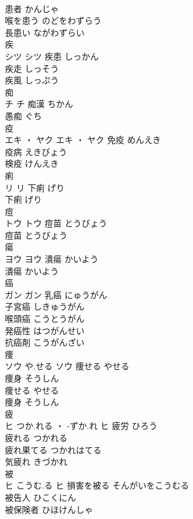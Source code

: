 \documentclass[8pt]{extreport}
\begin{document}
\begin{CJK}{UTF8}{min}
\\	患者	かんじゃ	
\\	喉を患う	のどをわずらう	
\\	長患い	ながわずらい	
\\	疾	
\\	シツ		シツ	疾患	しっかん	
\\	疾走	しっそう	
\\	疾風	しっぷう	
\\	痴	
\\	チ		チ	痴漢	ちかん	
\\	愚痴	ぐち	
\\	疫	
\\	エキ ・ ヤク		エキ ・ ヤク	免疫	めんえき	
\\	疫病	えきびょう	
\\	検疫	けんえき	
\\	痢	
\\	リ		リ	下痢	げり	
\\	下痢	げり	
\\	痘	
\\	トウ		トウ	痘苗	とうびょう	
\\	痘苗	とうびょう	
\\	瘍	
\\	ヨウ		ヨウ	潰瘍	かいよう	
\\	潰瘍	かいよう	
\\	癌	
\\	ガン		ガン	乳癌	にゅうがん	
\\	子宮癌	しきゅうがん	
\\	喉頭癌	こうとうがん	
\\	発癌性	はつがんせい	
\\	抗癌剤	こうがんざい	
\\	痩	
\\	ソウ	や.せる	ソウ	痩せる	やせる	
\\	痩身	そうしん	
\\	痩せる	やせる	
\\	痩身	そうしん	
\\	疲	
\\	ヒ	つか.れる ・ -ずか.れ	ヒ	疲労	ひろう	
\\	疲れる	つかれる	
\\	疲れ果てる	つかれはてる	
\\	気疲れ	きづかれ	
\\	被	
\\	ヒ	こうむ.る	ヒ	損害を被る	そんがいをこうむる	
\\	被告人	ひこくにん	
\\	被保険者	ひほけんしゃ	

\end{CJK}
\end{document}
